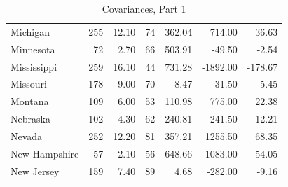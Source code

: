 \documentclass[nohyper,justified]{tufte-handout}\usepackage[]{graphicx}\usepackage[]{color}
\begin{document}
\begin{table}[ht]
\begin{tabular}{lrrrrrr}
   \rowcolor[gray]{0.95}Michigan & 255 & 12.10 &  74 & 362.04 & 714.00 & 36.63 \\ 
  Minnesota &  72 & 2.70 &  66 & 503.91 & -49.50 & -2.54 \\ 
   \rowcolor[gray]{0.95}Mississippi & 259 & 16.10 &  44 & 731.28 & -1892.00 & -178.67 \\ 
  Missouri & 178 & 9.00 &  70 & 8.47 & 31.50 & 5.45 \\ 
   \rowcolor[gray]{0.95}Montana & 109 & 6.00 &  53 & 110.98 & 775.00 & 22.38 \\ 
  Nebraska & 102 & 4.30 &  62 & 240.81 & 241.50 & 12.21 \\ 
   \rowcolor[gray]{0.95}Nevada & 252 & 12.20 &  81 & 357.21 & 1255.50 & 68.35 \\ 
  New Hampshire &  57 & 2.10 &  56 & 648.66 & 1083.00 & 54.05 \\ 
   \rowcolor[gray]{0.95}New Jersey & 159 & 7.40 &  89 & 4.68 & -282.00 & -9.16 \\ 
   \bottomrule
\end{tabular}
\caption{Covariances, Part 1} 
\end{table}
\end{document}
